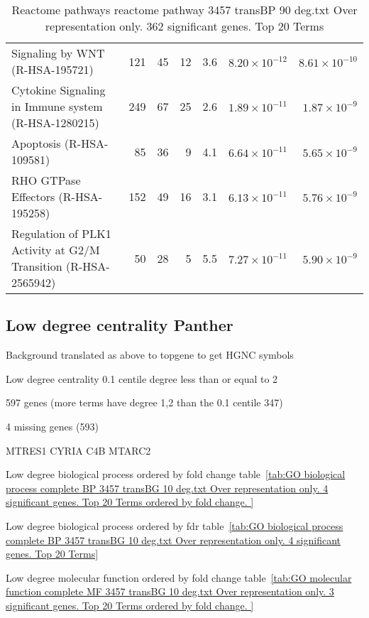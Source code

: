 \begin{table}[ht]
\begin{adjustbox}{width=\textwidth}
\begin{tabular}{lrrrrrr}
  Signaling by WNT (R-HSA-195721) & 121 & 45 & 12 & 3.6 & $8.20 \times 10^{-12}$ & $8.61 \times 10^{-10}$ \\ 
  Cytokine Signaling in Immune system (R-HSA-1280215) & 249 & 67 & 25 & 2.6 & $1.89 \times 10^{-11}$ & $1.87 \times 10^{-9}$ \\ 
  Apoptosis (R-HSA-109581) & 85 & 36 & 9 & 4.1 & $6.64 \times 10^{-11}$ & $5.65 \times 10^{-9}$ \\ 
  RHO GTPase Effectors (R-HSA-195258) & 152 & 49 & 16 & 3.1 & $6.13 \times 10^{-11}$ & $5.76 \times 10^{-9}$ \\ 
  Regulation of PLK1 Activity at G2/M Transition (R-HSA-2565942) & 50 & 28 & 5 & 5.5 & $7.27 \times 10^{-11}$ & $5.90 \times 10^{-9}$ \\ 
   \hline
\end{tabular}
\end{adjustbox}
\caption{Reactome pathways reactome pathway 3457 transBP 90 deg.txt Over representation only. 362 significant genes. Top 20 Terms} 
\label{tab:Reactome pathways reactome pathway 3457 transBP 90 deg.txt Over representation only. 362 significant genes. Top 20 Terms}
\end{table}


\subsection{Low degree centrality Panther}

Background translated as above to topgene to get HGNC symbols

Low degree centrality 0.1 centile degree less than or equal to 2

597 genes (more terms have degree 1,2 than the 0.1 centile 347)

4 missing genes (593)

MTRES1
CYRIA
C4B
MTARC2

Low degree biological process ordered by fold change table~\ref{tab:GO biological process complete BP 3457 transBG 10 deg.txt Over representation only. 4 significant genes. Top 20 Terms ordered by fold change. }


Low degree biological process ordered by fdr table~\ref{tab:GO biological process complete BP 3457 transBG 10 deg.txt Over representation only. 4 significant genes. Top 20 Terms}

Low degree molecular function ordered by fold change table~\ref{tab:GO molecular function complete MF 3457 transBG 10 deg.txt Over representation only. 3 significant genes. Top 20 Terms ordered by fold change. }


